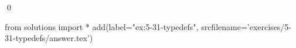 
\begin{ex}
  \label{ex:5-31-typedefs}
  
  \qed
\end{ex}
\begin{python0}
from solutions import *
add(label="ex:5-31-typedefs",
    srcfilename='exercises/5-31-typedefs/answer.tex')
\end{python0}
